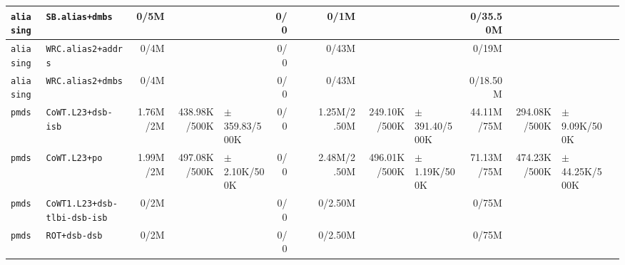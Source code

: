 \begin{tabular}{l l  | r r l | r r l | r r l | r r l l}
    \verb|aliasing| &                                       \verb|SB.alias+dmbs| &           0/5M &                       &                   &            0/0 &                       &                 &           0/1M &                       &                   &       0/35.50M &                       &                   & \\ \hline 
    \verb|aliasing| &                                    \verb|WRC.alias2+addrs| &           0/4M &                       &                   &            0/0 &                       &                 &          0/43M &                       &                   &          0/19M &                       &                   & \\ \hline 
    \verb|aliasing| &                                     \verb|WRC.alias2+dmbs| &           0/4M &                       &                   &            0/0 &                       &                 &          0/43M &                       &                   &       0/18.50M &                       &                   & \\ \hline 
        \verb|pmds| &                                    \verb|CoWT.L23+dsb-isb| &       1.76M/2M &          438.98K/500K & $\pm$ 359.83/500K &            0/0 &                       &                 &    1.25M/2.50M &          249.10K/500K & $\pm$ 391.40/500K &     44.11M/75M &          294.08K/500K &  $\pm$ 9.09K/500K & \\ \hline 
        \verb|pmds| &                                         \verb|CoWT.L23+po| &       1.99M/2M &          497.08K/500K &  $\pm$ 2.10K/500K &            0/0 &                       &                 &    2.48M/2.50M &          496.01K/500K &  $\pm$ 1.19K/500K &     71.13M/75M &          474.23K/500K & $\pm$ 44.25K/500K & \\ \hline 
        \verb|pmds| &                          \verb|CoWT1.L23+dsb-tlbi-dsb-isb| &           0/2M &                       &                   &            0/0 &                       &                 &        0/2.50M &                       &                   &          0/75M &                       &                   & \\ \hline 
        \verb|pmds| &                                         \verb|ROT+dsb-dsb| &           0/2M &                       &                   &            0/0 &                       &                 &        0/2.50M &                       &                   &          0/75M &                       &                   & \\ \hline 

\end{tabular}
